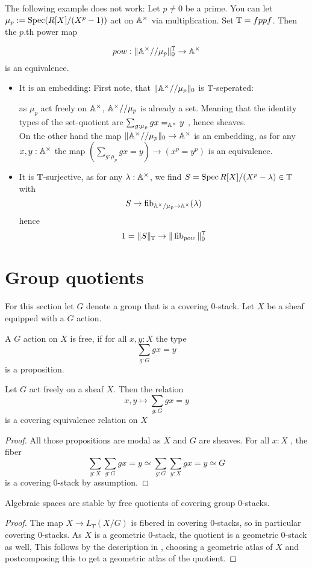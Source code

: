 \begin{rmk}
	The following example does not work: Let $p \neq 0$ be a prime. You can let $\mu_p := \operatorname{Spec}(R[X] / (X^p - 1))$ act on $\mathbb{A}^\times$ via multiplication. Set $\mathbb{T}= fppf$. Then the $p$.th power map
	
	\[
	pow : \| \mathbb{A}^\times // \mu_p \|_0^{\mathbb{T}} \to \mathbb{A}^\times
	\]
	is an equivalence.
	\begin{itemize}
		\item 	 It is an embedding: 
		First note, that $\|\mathbb{A}^\times // \mu_p \|_0$ is $\mathbb{T}$-seperated:
		
		as $\mu_p$ act freely on $\mathbb{A}^\times$, $\mathbb{A}^\times // \mu_p$ is already a set. Meaning that the identity types of the set-quotient are $\sum_{g: \mu_p} g x =_{\mathbb{A}^\times} y$ , hence sheaves. \\
		On the other hand the map $\|\mathbb{A}^\times // \mu_p \|_0 \to \mathbb{A}^\times$ is an embedding, as for any $x , y : \mathbb{A}^\times$ the map $(\sum_{g : \mu_p} g x = y) \to (x^p = y^p)$ is an equivalence. 
		\item 	It is $\mathbb{T}$-surjective, as for any $\lambda : \mathbb{A}^\times$, we find $S = \operatorname{Spec} R [X] / (X^p - \lambda) \in \mathbb{T}$ with 
		\[
		S \to \operatorname{fib}_{\mathbb{A}^\times / \mu_p \to \mathbb{A}^\times}(\lambda)
		\]
		hence 
		\[
		1 = \|S\|_{\mathbb{T}} \to \|\operatorname{fib}_{pow}\|_0^{\mathbb{T}}
		\]
	\end{itemize}
	
	
\end{rmk}
\section{Group quotients}
For this section let $G$ denote a group that is a covering 0-stack. Let $X$ be a sheaf equipped with a $G$ action.
\begin{definition}
	A $G$ action on $X$ is free, if for all $x , y : X$ the type 
	\[
	\sum_{g: G} g x = y
	\]
	is a proposition. 
\end{definition}
\begin{lemma}
	Let $G$ act freely on a sheaf $X$. Then the relation
	\[
	x , y\mapsto \sum_{g : G} g x = y
	\]
	is a covering equivalence relation on $X$
\end{lemma}
\begin{proof}
	All those propositions are modal as $X$ and $G$ are sheaves. For all $x : X$ , the fiber
	\[
	\sum_{y : X} \sum_{g : G} g x = y \simeq \sum_{g : G} \sum_{y: X} g x = y \simeq G
	\]
	is a covering 0-stack by assumption.
\end{proof}
\begin{lemma}{\label{lemma:algSpacesStabFreeQuots}}
	Algebraic spaces are stable by free quotients of covering group 0-stacks.
\end{lemma}
\begin{proof}
	The map $ X \to L_T (X / G)$ is fibered in covering 0-stacks, so in particular covering $0$-stacks. As $X$ is a geometric $0$-stack, the quotient is a geometric $0$-stack as well, This follows by the description in \label{prop:nstack}, choosing a geometric atlas of $X$ and postcomposing this to get a geometric atlas of the quotient.
\end{proof}

